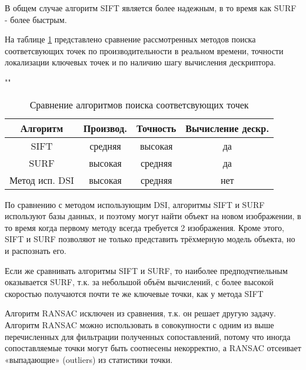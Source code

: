 В общем случае алгоритм SIFT является более надежным, в то время как SURF - более быстрым.

На таблице \ref{tab} представлено сравнение рассмотренных методов поиска соответсвующих точек по производительности в реальном времени, точности локализации ключевых точек и по наличию шагу вычисления дескриптора.

\begin{table}[H]
	\begin{center}
		\caption{Сравнение алгоритмов поиска соответсвующих точек}
		\label{tab}
		""\newline
		\begin{tabular}{ | c | c | c | c | }
			\hline
			Алгоритм & Производ.  & Точность & Вычисление дескр. \\ \hline
			SIFT & средняя & высокая & да \\ \hline
			SURF & высокая & средняя & да \\ \hline
			Метод исп. DSI & высокая & средняя & нет \\ \hline
		\end{tabular}
	\end{center}
\end{table}

По сравнению с методом использующим DSI, алгоритмы SIFT и SURF используют базы данных, и поэтому могут найти объект на новом изображении, в то время когда первому методу всегда требуется 2 изображения. Кроме этого, SIFT и SURF позволяют не только представить трёхмерную модель объекта, но и распознать его.

Если же сравнивать алгоритмы SIFT и SURF, то наиболее предподчтиельным оказывается SURF, т.к. за небольшой объём вычислений, с более высокой скоростью получаются почти те же ключевые точки, как у метода SIFT

Алгоритм RANSAC исключен из сравнения, т.к. он решает другую задачу. Алгоритм RANSAC можно использовать в совокупности с одним из выше перечисленных для фильтрации полученных сопоставлений, потому что иногда сопоставляемые точки могут быть соотнесены некорректно, а RANSAC отсеивает «выпадающие» (outliers) из статистики точки.

